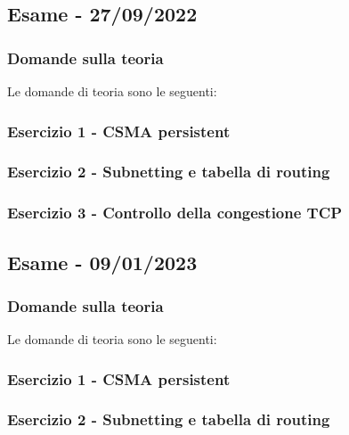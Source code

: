 \documentclass[a4paper]{article}
\begin{document}
	\newpage

	\subsection[\textbf{Esame - 27/09/2022}]{Esame - 27/09/2022}
	
	\subsubsection{Domande sulla teoria}
	Le domande di teoria sono le seguenti:
	
	\subsubsection{Esercizio 1 - CSMA persistent}
	
	\subsubsection{Esercizio 2 - Subnetting e tabella di routing}
	
	\subsubsection{Esercizio 3 - Controllo della congestione TCP}
	
	\newpage

	\subsection[\textbf{Esame - 09/01/2023}]{Esame - 09/01/2023}
	
	\subsubsection{Domande sulla teoria}
	Le domande di teoria sono le seguenti:
	
	\subsubsection{Esercizio 1 - CSMA persistent}
	
	\subsubsection{Esercizio 2 - Subnetting e tabella di routing}
	
\end{document}
